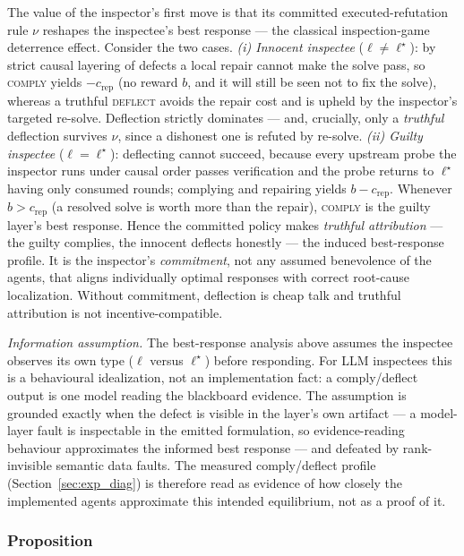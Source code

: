 \documentclass[a4paper,fleqn]{cas-sc}
\begin{document}
The value of the inspector's first move is that its committed
executed-refutation rule $\nu$ reshapes the inspectee's best response ---
the classical inspection-game deterrence effect. Consider the two cases.
\emph{(i) Innocent inspectee} ($\ell\neq\ell^{\star}$): by strict causal
layering of defects a local repair cannot make the solve pass, so
\textsc{comply} yields $-c_{\mathrm{rep}}$ (no reward $b$, and it will still
be seen not to fix the solve), whereas a truthful \textsc{deflect} avoids the
repair cost and is upheld by the inspector's targeted re-solve. Deflection
strictly dominates --- and, crucially, only a \emph{truthful} deflection
survives $\nu$, since a dishonest one is refuted by re-solve.
\emph{(ii) Guilty inspectee} ($\ell=\ell^{\star}$): deflecting cannot succeed,
because every upstream probe the inspector runs under causal order passes
verification and the probe returns to $\ell^{\star}$ having only consumed
rounds; complying and repairing yields $b-c_{\mathrm{rep}}$. Whenever
$b>c_{\mathrm{rep}}$ (a resolved solve is worth more than the repair),
\textsc{comply} is the guilty layer's best response. Hence the committed
policy makes \emph{truthful attribution} --- the guilty complies, the
innocent deflects honestly --- the induced best-response profile. It is the
inspector's \emph{commitment}, not any assumed benevolence of the agents,
that aligns individually optimal responses with correct root-cause
localization. Without commitment, deflection is cheap talk and truthful
attribution is not incentive-compatible.

\emph{Information assumption.} The best-response analysis above assumes
the inspectee observes its own type ($\ell$ versus $\ell^{\star}$) before
responding. For LLM inspectees this is a behavioural idealization, not an
implementation fact: a comply/deflect output is one model reading the
blackboard evidence. The assumption is grounded exactly when the defect is
visible in the layer's own artifact --- a model-layer fault is inspectable
in the emitted formulation, so evidence-reading behaviour approximates the
informed best response --- and defeated by rank-invisible semantic data
faults. The measured comply/deflect profile (Section~\ref{sec:exp_diag})
is therefore read as evidence of how closely the implemented agents
approximate this intended equilibrium, not as a proof of it.

\subsubsection{Proposition}
\label{sec:proposition}
\end{document}
